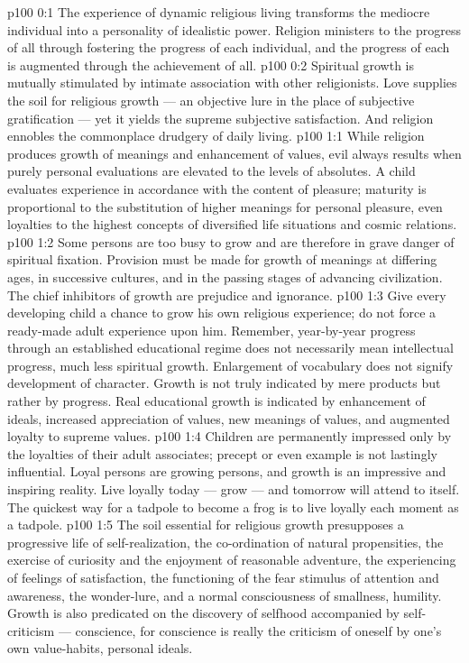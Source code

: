 \author{Melchizedek}
\vs p100 0:1 The experience of dynamic religious living transforms the mediocre individual into a personality of idealistic power. Religion ministers to the progress of all through fostering the progress of each individual, and the progress of each is augmented through the achievement of all.
\vs p100 0:2 Spiritual growth is mutually stimulated by intimate association with other religionists. Love supplies the soil for religious growth --- an objective lure in the place of subjective gratification --- yet it yields the supreme subjective satisfaction. And religion ennobles the commonplace drudgery of daily living.
\vs p100 1:1 While religion produces growth of meanings and enhancement of values, evil always results when purely personal evaluations are elevated to the levels of absolutes. A child evaluates experience in accordance with the content of pleasure; maturity is proportional to the substitution of higher meanings for personal pleasure, even loyalties to the highest concepts of diversified life situations and cosmic relations.
\vs p100 1:2 Some persons are too busy to grow and are therefore in grave danger of spiritual fixation. Provision must be made for growth of meanings at differing ages, in successive cultures, and in the passing stages of advancing civilization. The chief inhibitors of growth are prejudice and ignorance.
\vs p100 1:3 Give every developing child a chance to grow his own religious experience; do not force a ready\hyp{}made adult experience upon him. Remember, year\hyp{}by\hyp{}year progress through an established educational regime does not necessarily mean intellectual progress, much less spiritual growth. Enlargement of vocabulary does not signify development of character. Growth is not truly indicated by mere products but rather by progress. Real educational growth is indicated by enhancement of ideals, increased appreciation of values, new meanings of values, and augmented loyalty to supreme values.
\vs p100 1:4 Children are permanently impressed only by the loyalties of their adult associates; precept or even example is not lastingly influential. Loyal persons are growing persons, and growth is an impressive and inspiring reality. Live loyally today --- grow --- and tomorrow will attend to itself. The quickest way for a tadpole to become a frog is to live loyally each moment as a tadpole.
\vs p100 1:5 \pc The soil essential for religious growth presupposes a progressive life of self\hyp{}realization, the co\hyp{}ordination of natural propensities, the exercise of curiosity and the enjoyment of reasonable adventure, the experiencing of feelings of satisfaction, the functioning of the fear stimulus of attention and awareness, the wonder\hyp{}lure, and a normal consciousness of smallness, humility. Growth is also predicated on the discovery of selfhood accompanied by self\hyp{}criticism --- conscience, for conscience is really the criticism of oneself by one’s own value\hyp{}habits, personal ideals.
